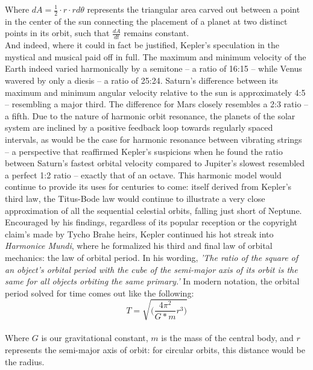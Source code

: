 \documentclass{article}
\begin{document}
Where $dA = \frac{1}{2} \cdot r \cdot rd \theta $ represents the triangular area carved out between a point in the center of the sun connecting the placement of a planet at two distinct points in its orbit, such that $\frac{dA}{dt}$ remains constant. \\ 

And indeed, where it could in fact be justified, Kepler’s speculation in the mystical and musical paid off in full. The maximum and minimum velocity of the Earth indeed varied harmonically by a semitone – a ratio of 16:15 – while Venus wavered by only a diesis – a ratio of 25:24. Saturn’s difference between its maximum and minimum angular velocity relative to the sun is approximately 4:5 – resembling a major third.  The difference for Mars closely resembles a 2:3 ratio – a fifth. \cite{historyofmathematics} Due to the nature of harmonic orbit resonance, the planets of the solar system are inclined by a positive feedback loop towards regularly spaced intervals, as would be the case for harmonic resonance between vibrating strings – a perspective that reaffirmed Kepler’s suspicions when he found the ratio between Saturn’s fastest orbital velocity compared to Jupiter’s slowest resembled a perfect 1:2 ratio – exactly that of an octave. This harmonic model would continue to provide its uses for centuries to come: itself derived from Kepler’s third law, the Titus-Bode law would continue to illustrate a very close approximation of all the sequential celestial orbits, falling just short of Neptune. \cite{physics} \\

 Encouraged by his findings, regardless of its popular reception or the copyright claim's made by Tycho Brahe heirs, \cite{heirs} Kepler continued his hot streak into \textit{Harmonice Mundi}, where he formalized his third and final law of orbital mechanics: the law of orbital period. In his wording, \textit{'The ratio of the square of an object's orbital period with the cube of the semi-major axis of its orbit is the same for all objects orbiting the same primary.'} In modern notation, the orbital period solved for time comes out like the following:\\

$$ T = \sqrt{ \bigg( \frac{4 \pi ^2}{G*m} r^3 \bigg) } $$ \\

Where $G$ is our gravitational constant, $m$ is the mass of the central body, and $r$ represents the semi-major axis of orbit: for circular orbits, this distance would be the radius. \\ 
\end{document}
